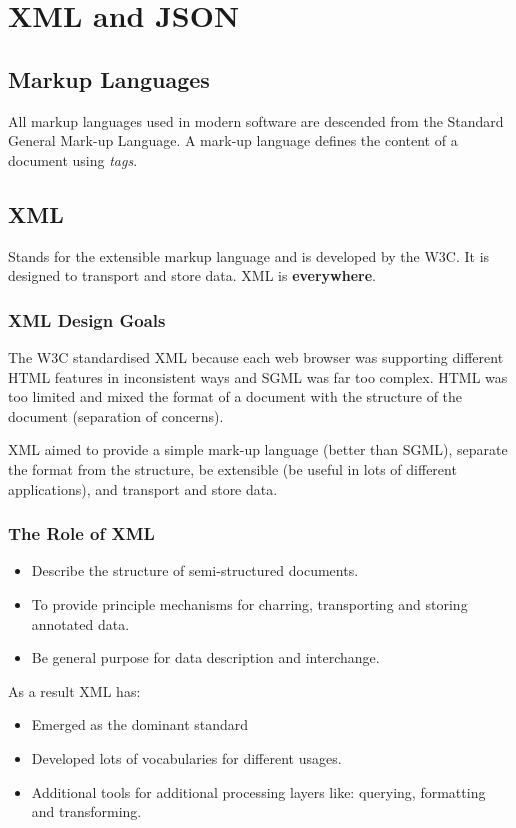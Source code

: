 \section{XML and JSON}\label{sec:xml_and_json}

\subsection{Markup Languages}\label{sub:markup_languages}

All markup languages used in modern software are descended from the Standard General Mark-up Language.
A mark-up language defines the content of a document using \emph{tags}.

\subsection{XML}\label{sub:xml}

Stands for the extensible markup language and is developed by the W3C.
It is designed to transport and store data.
XML is \textbf{everywhere}.

\subsubsection{XML Design Goals}\label{ssub:xml_design_goals}

The W3C standardised XML because each web browser was supporting different HTML features in inconsistent ways and SGML was far too complex.
HTML was too limited and mixed the format of a document with the structure of the document (separation of concerns).

XML aimed to provide a simple mark-up language (better than SGML), separate the format from the structure, be extensible (be useful in lots of different applications), and transport and store data.

\subsubsection{The Role of XML}\label{ssub:the_role_of_xml}

\begin{itemize}
	\item Describe the structure of semi-structured documents.
	\item To provide principle mechanisms for charring, transporting and storing annotated data.
	\item Be general purpose for data description and interchange.
\end{itemize}
As a result XML has:
\begin{itemize}
	\item Emerged as the dominant standard
	\item Developed lots of vocabularies for different usages.
	\item Additional tools for additional processing layers like: querying, formatting and transforming.
\end{itemize}

